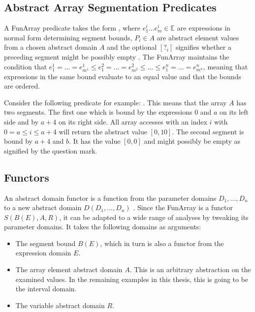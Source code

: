 \subsection{Abstract Array Segmentation Predicates}

A FunArray predicate takes the form , where $e^i_1\ldots e^i_m\in\mathbb{E}$ are expressions in normal form determining segment bounds, $P_i\in A$ are abstract element values from a chosen abstract domain $A$ and the optional $[?_i]$ signifies whether a preceding segment might be possibly empty \cite{cousot2011}. The FunArray maintains the condition that $e_1^1=\ldots=e_{m^1}^1\leq e_1^2=\ldots=e_{m^2}^2\leq\ldots\leq e_1^n=\ldots=e_{m^n}^n$, meaning that expressions in the same bound evaluate to an equal value and that the bounds are ordered. 


\noindent Consider the following predicate for example: . This means that the array $A$ has two segments. The first one which is bound by the expressions $0$ and $a$ on its left side and by $a+4$ on its right side. All array accesses with an index $i$ with $0=a\leq i \leq a+ 4$ will return the abstract value $[0,10]$. The second segment is bound by $a+4$ and $b$. It has the value $[0,0]$ and might possibly be empty as signified by the question mark.


\subsection{Functors}

An abstract domain functor is a function from the parameter domains $D_1,\ldots,D_n$ to a new abstract domain $D(D_1,\ldots,D_n)$ \cite{cousot2011}.
Since the FunArray is a functor $S(B(E),A,R)$, it can be adapted to a wide range of analyses by tweaking its parameter domains. It takes the following domains as arguments:
\begin{itemize}[label={--}]
	\item The segment bound $B(E)$, which in turn is also a functor from the expression domain $E$.
	\item The array element abstract domain $A$. This is an arbitrary abstraction on the examined values. In the remaining examples in this thesis, this is going to be the interval domain.
	\item The variable abstract domain $R$.
\end{itemize} 

